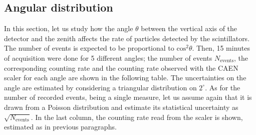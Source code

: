 \documentclass[a4paper]{article}
\begin{document}
 



\subsection{Angular distribution}
In this section, let us study how the angle $\theta$ between the vertical axis of the detector and the zenith affects the rate of particles detected by the scintillators. The number of events is expected to be proportional to $\mathrm{cos}^2\theta$. 
Then, 15 minutes of acquisition were done for 5 different angles; the number of events $N_{\mathrm{events}}$, the corresponding counting rate and the counting rate observed with the CAEN scaler for each angle are shown in the following table. 
The uncertainties on the angle are estimated by considering a triangular distribution on $2^\circ$. As for the number of recorded events, being a single measure, let us assume again that it is drawn from a Poisson distribution and estimate its statistical uncertainty as $\sqrt{N_{\mathrm{events}}}$. In the last column, the counting rate read from the scaler is shown, estimated as in previous paragraphs. %
\end{document}
